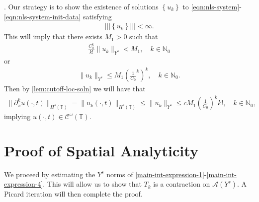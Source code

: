 \documentclass[12pt,reqno]{amsart}
\numberwithin{equation}{section}  %
\numberwithin{figure}{section}
\newcommand{\ci}{\mathbb{T}}
\newcommand{\p}{\partial}
\theoremstyle{plain}
\theoremstyle{definition}
\theoremstyle{remark}
\begin{document}
\cite{Kato:2000vn}. Our strategy is to show the existence of solutions $\left\{
u_k \right\}$ to \eqref{eqn:nls-system}-\eqref{eqn:nls-system-init-data}
satisfying
%
%
\begin{equation*}
\begin{split}
  | | |\left\{ u_k \right\} | | | < \infty.
\end{split}
\end{equation*}
%
%
This will imply that there exists $M_1 >0$ such that
%
%
\begin{equation*}
\begin{split}
  \frac{C_0^k}{k!} \|u_k\|_{Y^s} < M_1, \quad k \in \mathbb{N}_0
\end{split}
\end{equation*}
%
%
or
%
%
\begin{equation*}
\begin{split}
  \|u_k\|_{Y^s} \le M_1 \left( \frac{1}{C_0}^k  \right)^k, \quad k \in
  \mathbb{N}_0.
\end{split}
\end{equation*}
%
%
Then by \cref{lem:cutoff-loc-soln} we will have that
%
%
\begin{equation*}
\begin{split}
  \|\p_x^k u(\cdot, t) \|_{H^s(\ci)} = \|u_k(\cdot, t) \|_{H^s(\ci)} \le \|u_k
  \|_{Y^s} \le c M_1 \left( \frac{1}{C_0} \right)^k k!, \quad k \in
  \mathbb{N}_0,
\end{split}
\end{equation*}
%
%
implying $u(\cdot, t) \in \mathcal{C}^\omega (\ci)$. 
%
%
%
%
%
%
%
%
%
\section{Proof of Spatial Analyticity} 
\label{sec:proof-spat-anal}
We proceed by estimating the $Y^s$ norms of
\eqref{main-int-expression-1}-\eqref{main-int-expression-4}. This will allow us
to show that $T_k$ is a contraction on $\mathcal{A}(Y^s)$. A Picard iteration
will then complete the proof. 
%
%
\end{document}
